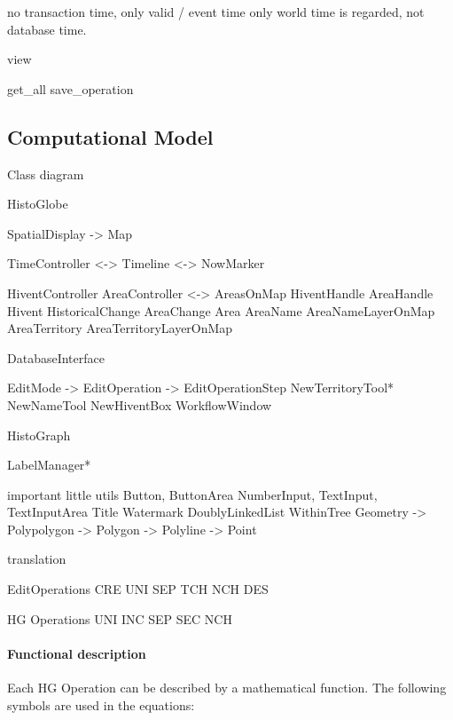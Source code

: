 no transaction time, only valid / event time
only world time is regarded, not database time.

view

get\_all
save\_operation



\subsection{Computational Model} %
\label{sub:computational_model}

Class diagram

HistoGlobe

SpatialDisplay -> Map

TimeController  <-> Timeline
                <-> NowMarker

HiventController                AreaController <->  AreasOnMap
HiventHandle                    AreaHandle
Hivent
HistoricalChange    AreaChange  Area
                                AreaName            AreaNameLayerOnMap
                                AreaTerritory       AreaTerritoryLayerOnMap

DatabaseInterface

EditMode -> EditOperation -> EditOperationStep
NewTerritoryTool* NewNameTool NewHiventBox
WorkflowWindow

HistoGraph

LabelManager*

important little utils
  Button, ButtonArea
  NumberInput, TextInput, TextInputArea
  Title
  Watermark
  DoublyLinkedList
  WithinTree
  Geometry -> Polypolygon -> Polygon -> Polyline -> Point

translation

EditOperations   CRE   UNI   SEP   TCH   NCH   DES

HG Operations     UNI   INC   SEP   SEC   NCH

\paragraph{Functional description} %
\label{par:functional_description}

Each HG Operation can be described by a mathematical function. The following symbols are used in the equations:

